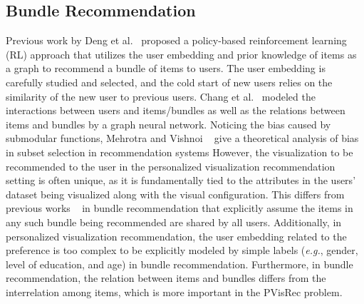 \subsection{Bundle Recommendation}
Previous work by Deng et al.~\cite{deng2021build} proposed a policy-based reinforcement learning (RL) approach that utilizes the user embedding and prior knowledge of items as a graph to recommend a bundle of items to users.
The user embedding is carefully studied and selected, and the cold start of new users relies on the similarity of the new user to previous users.
Chang et al.~\cite{chang2020bundle} modeled the interactions between users and items/bundles as well as the relations between items and bundles by a graph neural network. Noticing the bias caused by submodular functions, Mehrotra and Vishnoi ~\cite{mehrotra2023maximizing} give a theoretical analysis of bias in subset selection in recommendation systems
However, the visualization to be recommended to the user in the personalized visualization recommendation setting is often unique, as it is fundamentally tied to the attributes in the users' dataset being visualized along with the visual configuration.
This differs from previous works ~\cite{deng2021build,chang2020bundle} in bundle recommendation that explicitly assume the items in any such bundle being recommended are shared by all users.
Additionally, in personalized visualization recommendation, the user embedding related to the preference is too complex to be explicitly modeled by simple labels (\emph{e.g.}, gender, level of education, and age) in bundle recommendation. 
Furthermore, in bundle recommendation, the relation between items and bundles differs from the interrelation among items, which is more important in the PVisRec problem.